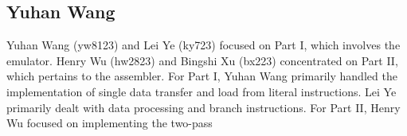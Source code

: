 \documentclass[11pt]{article}
\begin{document}
\subsection{Yuhan Wang}

Yuhan Wang (yw8123) and Lei Ye (ky723) focused on Part I, which involves the emulator. Henry Wu (hw2823) and Bingshi Xu (bx223) concentrated on Part II, which pertains to the assembler.
For Part I, Yuhan Wang primarily handled the implementation of single data transfer and load from literal instructions. Lei Ye primarily dealt with data processing and branch instructions.
For Part II, Henry Wu focused on implementing the two-pass 
\end{document}

